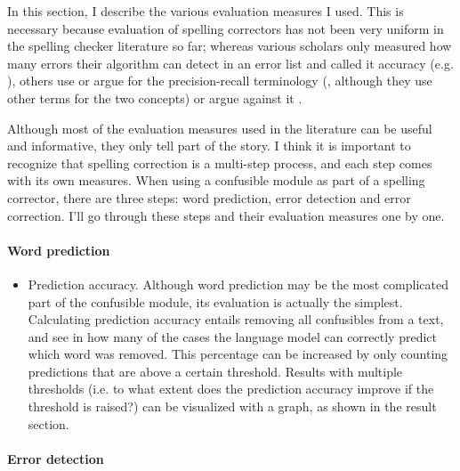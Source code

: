 \documentclass[12pt]{article}
\begin{document}
In this section, I describe the various evaluation measures I used. This is necessary because evaluation of spelling correctors has not been very uniform in the spelling checker literature so far; whereas various scholars only measured how many errors their algorithm can detect in an error list and called it accuracy (e.g. \citealp{agirre98, bm00, tm02,vandelden04}), others use or argue for the precision-recall terminology (\citealp{reynaert08,pz84}, although they use other terms for the two concepts) or argue against it \citep{sp02}.\\\indent

Although most of the evaluation measures used in the literature can be useful and informative, they only tell part of the story. I think it is important to recognize that spelling correction is a multi-step process, and each step comes with its own measures. When using a confusible module as part of a spelling corrector, there are three steps: word prediction, error detection and error correction. I'll go through these steps and their evaluation measures one by one.

\paragraph{Word prediction}

\begin{itemize}
\item Prediction accuracy. Although word prediction may be the most complicated part of the confusible module, its evaluation is actually the simplest. Calculating prediction accuracy entails removing all confusibles from a text, and see in how many of the cases the language model can correctly predict which word was removed. This percentage can be increased by only counting predictions that are above a certain threshold. Results with multiple thresholds (i.e. to what extent does the prediction accuracy improve if the threshold is raised?) can be visualized with a graph, as shown in the result section.
\end{itemize}

\paragraph{Error detection}
\end{document}
